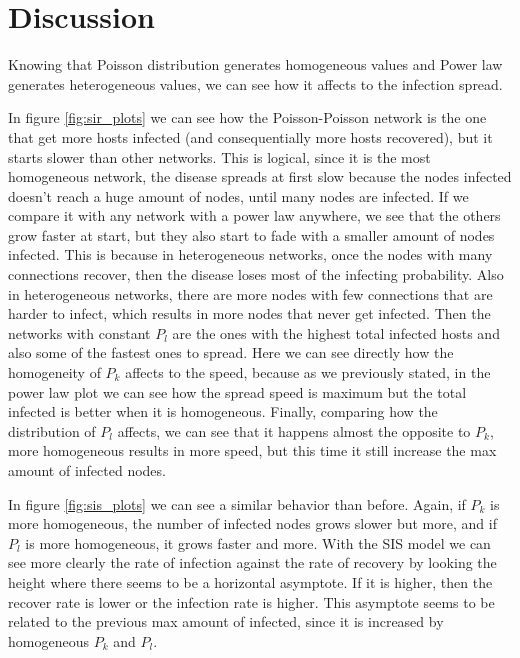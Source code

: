 \section{Discussion}
Knowing that Poisson distribution generates homogeneous values and Power law generates heterogeneous values, we can see how it affects to the infection spread. 

In figure \ref{fig:sir_plots} we can see how the Poisson-Poisson network is the one that get more hosts infected (and consequentially more hosts recovered), but it starts slower than other networks. This is logical, since it is the most homogeneous network, the disease spreads at first slow because the nodes infected doesn't reach a huge amount of nodes, until many nodes are infected. If we compare it with any network with a power law anywhere, we see that the others grow faster at start, but they also start to fade with a smaller amount of nodes infected. This is because in heterogeneous networks, once the nodes with many connections recover, then the disease loses most of the infecting probability. Also in heterogeneous networks, there are more nodes with few connections that are harder to infect, which results in more nodes that never get infected. Then the networks with constant $P_l$ are the ones with the highest total infected hosts and also some of the fastest ones to spread. Here we can see directly how the homogeneity of $P_k$ affects to the speed, because as we previously stated, in the power law plot we can see how the spread speed is maximum but the total infected is better when it is homogeneous. Finally, comparing how the distribution of $P_l$ affects, we can see that it happens almost the opposite to $P_k$, more homogeneous results in more speed, but this time it still increase the max amount of infected nodes.

In figure \ref{fig:sis_plots} we can see a similar behavior than before. Again, if $P_k$ is more homogeneous, the number of infected nodes grows slower but more, and if $P_l$ is more homogeneous, it grows faster and more. With the SIS model we can see more clearly the rate of infection against the rate of recovery by looking the height where there seems to be a horizontal asymptote. If it is higher, then the recover rate is lower or the infection rate is higher. This asymptote seems to be related to the previous max amount of infected, since it is increased by homogeneous $P_k$ and $P_l$.